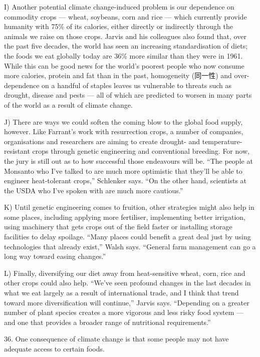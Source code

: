 \documentclass[UTF8,11pt]{ctexart}
\begin{document}
I) Another potential climate change-induced problem is our dependence on commodity crops — wheat, soybeans, corn and rice — which currently provide humanity with 75\% of its calories, either directly or indirectly through the animals we raise on those crops. Jarvis and his colleagues also found that, over the past five decades, the world has seen an increasing standardisation of diets; the foods we eat globally today are 36\% more similar than they were in 1961. While this can be good news for the world’s poorest people who now consume more calories, protein and fat than in the past, homogeneity (同一性) and over-dependence on a handful of staples leaves us vulnerable to threats such as drought, disease and pests — all of which are predicted to worsen in many parts of the world as a result of climate change.


J) There are ways we could soften the coming blow to the global food supply, however. Like Farrant’s work with resurrection crops, a number of companies, organisations and researchers are aiming to create drought- and temperature-resistant crops through genetic engineering and conventional breeding. For now, the jury is still out as to how successful those endeavours will be. “The people at Monsanto who I’ve talked to are much more optimistic that they’ll be able to engineer heat-tolerant crops,” Schlenker says. “On the other hand, scientists at the USDA who I’ve spoken with are much more cautious.”


K) Until genetic engineering comes to fruition, other strategies might also help in some places, including applying more fertiliser, implementing better irrigation, using machinery that gets crops out of the field faster or installing storage facilities to delay spoilage. “Many places could benefit a great deal just by using technologies that already exist,” Walsh says. “General farm management can go a long way toward easing changes.”


L) Finally, diversifying our diet away from heat-sensitive wheat, corn, rice and other crops could also help. “We’ve seen profound changes in the last decades in what we eat largely as a result of international trade, and I think that trend toward more diversification will continue,” Jarvis says. “Depending on a greater number of plant species creates a more vigorous and less risky food system — and one that provides a broader range of nutritional requirements.”


36. One consequence of climate change is that some people may not have adequate access to certain foods.
\end{document}

